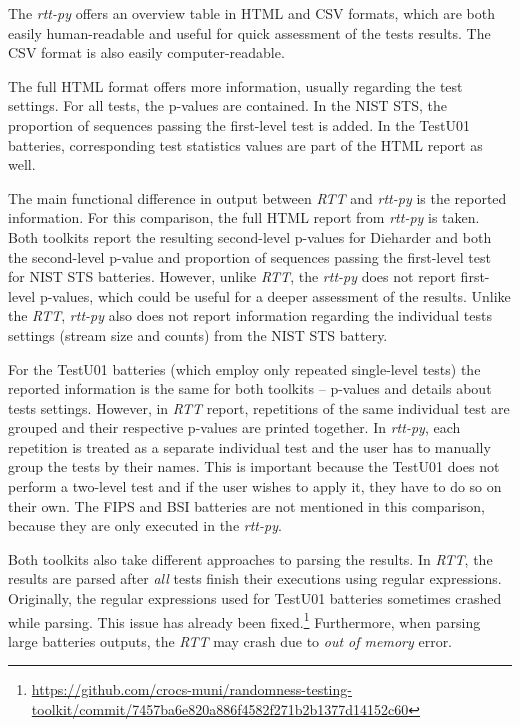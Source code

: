 \documentclass[
  digital,     %
  oneside,     %
  nosansbold,  %
  nocolorbold, %
  nolof,         %
  nolot,         %
]{fithesis4}
\begin{document}
The \emph{rtt-py} offers an overview table in HTML and CSV formats, which are both easily human-readable and useful for quick assessment of the tests results. The CSV format is also easily computer-readable. 

The full HTML format offers more information, usually regarding the test settings. For all tests, the p-values are contained. In the NIST STS, the proportion of sequences passing the first-level test is added. In the TestU01 batteries, corresponding test statistics values are part of the HTML report as well.

The main functional difference in output between \emph{RTT} and \emph{rtt-py} is the reported information. For this comparison, the full HTML report from \emph{rtt-py} is taken. Both toolkits report the resulting second-level p-values for Dieharder and both the second-level p-value and proportion of sequences passing the first-level test for NIST STS batteries. However, unlike \emph{RTT}, the \emph{rtt-py} does not report first-level p-values, which could be useful for a deeper assessment of the results. Unlike the \emph{RTT}, \emph{rtt-py} also does not report information regarding the individual tests settings (stream size and counts) from the NIST STS battery.

For the TestU01 batteries (which employ only repeated single-level tests) the reported information is the same for both toolkits -- p-values and details about tests settings. However, in \emph{RTT} report, repetitions of the same individual test are grouped and their respective p-values are printed together. In \emph{rtt-py}, each repetition is treated as a separate individual test and the user has to manually group the tests by their names. This is important because the TestU01 does not perform a two-level test and if the user wishes to apply it, they have to do so on their own. The FIPS and BSI batteries are not mentioned in this comparison, because they are only executed in the \emph{rtt-py}.

Both toolkits also take different approaches to parsing the results. In \emph{RTT}, the results are parsed after \emph{all} tests finish their executions using regular expressions. Originally, the regular expressions used for TestU01 batteries sometimes crashed while parsing. This issue has already been fixed.\footnote{\url{https://github.com/crocs-muni/randomness-testing-toolkit/commit/7457ba6e820a886f4582f271b2b1377d14152c60}} Furthermore, when parsing large batteries outputs, the \emph{RTT} may crash due to \emph{out of memory} error.
\end{document}
